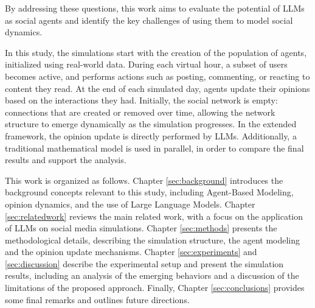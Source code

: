By addressing these questions, this work aims to evaluate the potential of LLMs as social agents and identify the key challenges of using them to model social dynamics.


\medskip
In this study, the simulations start with the creation of the population of agents, initialized using real-world data.
During each virtual hour, a subset of users becomes active, and performs actions such as posting, commenting, or reacting to content they read.
At the end of each simulated day, agents update their opinions based on the interactions they had.
Initially, the social network is empty: connections that are created or removed over time, allowing the network structure to emerge dynamically as the simulation progresses.
In the extended framework, the opinion update is directly performed by LLMs.
Additionally, a traditional mathematical model is used in parallel, in order to compare the final results and support the analysis.


\medskip
This work is organized as follows.
Chapter \ref{sec:background} introduces the background concepts relevant to this study, including Agent-Based Modeling, opinion dynamics, and the use of Large Language Models.
Chapter \ref{sec:relatedwork} reviews the main related work, with a focus on the application of LLMs on social media simulations.
Chapter \ref{sec:methods} presents the methodological details, describing the simulation structure, the agent modeling and the opinion update mechanisms.
Chapter \ref{sec:experiments} and \ref{sec:discussion} describe the experimental setup and present the simulation results, including an analysis of the emerging behaviors and a discussion of the limitations of the proposed approach.
Finally, Chapter \ref{sec:conclusions} provides some final remarks and outlines future directions.




